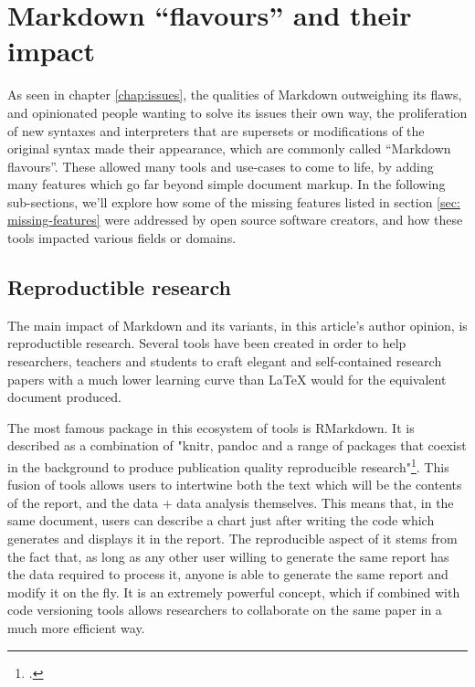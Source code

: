\section{Markdown ``flavours'' and their impact}

As seen in chapter \ref{chap:issues}, the qualities of Markdown outweighing its flaws, and opinionated people wanting to solve its issues
their own way, the proliferation of new syntaxes and interpreters that are supersets or modifications of the original syntax made their appearance,
which are commonly called ``Markdown flavours''. These allowed many tools and use-cases to come to life, by adding many features which go far
beyond simple document markup. In the following sub-sections, we'll explore how some of the missing features listed in section \ref{sec: missing-features}
were addressed by open source software creators, and how these tools impacted various fields or domains.

\subsection{Reproductible research}

The main impact of Markdown and its variants, in this article's author opinion, is reproductible research. Several tools have been created in order to help
researchers, teachers and students to craft elegant and self-contained research papers with a much lower learning curve than LaTeX would for the equivalent
document produced.\newline

The most famous package in this ecosystem of tools is RMarkdown. It is described as a combination of "knitr, pandoc and a range of packages that coexist
in the background to produce publication quality reproducible research"\footcite{racine2019energy}. This fusion of tools allows users to intertwine both
the text which will be the contents of the report, and the data + data analysis themselves. This means that, in the same document, users can describe
a chart just after writing the code which generates and displays it in the report. The reproducible aspect of it stems from the fact that, as long as
any other user willing to generate the same report has the data required to process it, anyone is able to generate the same report and modify it on the
fly. It is an extremely powerful concept, which if combined with code versioning tools allows researchers to collaborate on the same paper in a much more
efficient way.

